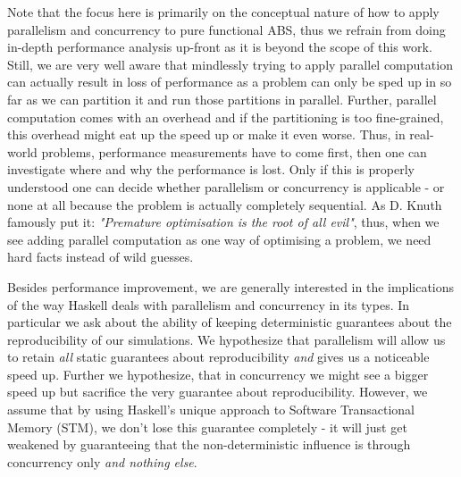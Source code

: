 Note that the focus here is primarily on the conceptual nature of how to apply parallelism and concurrency to pure functional ABS, thus we refrain from doing in-depth performance analysis up-front as it is beyond the scope of this work. Still, we are very well aware that mindlessly trying to apply parallel computation can actually result in loss of performance as a problem can only be sped up in so far as we can partition it and run those partitions in parallel. Further, parallel computation comes with an overhead and if the partitioning is too fine-grained, this overhead might eat up the speed up or make it even worse. Thus, in real-world problems, performance measurements have to come first, then one can investigate where and why the performance is lost. Only if this is properly understood one can decide whether parallelism or concurrency is applicable - or none at all because the problem is actually completely sequential. As D. Knuth famously put it: \textit{"Premature optimisation is the root of all evil"}, thus, when we see adding parallel computation as one way of optimising a problem, we need hard facts instead of wild guesses.

Besides performance improvement, we are generally interested in the implications of the way Haskell deals with parallelism and concurrency in its types. In particular we ask about the ability of keeping deterministic guarantees about the reproducibility of our simulations. We hypothesize that parallelism will allow us to retain \textit{all} static guarantees about reproducibility \textit{and} gives us a noticeable speed up. Further we hypothesize, that in concurrency we might see a bigger speed up but sacrifice the very guarantee about reproducibility. However, we assume that by using Haskell's unique approach to Software Transactional Memory (STM), we don't lose this guarantee completely - it will just get weakened by guaranteeing that the non-deterministic influence is through concurrency only \textit{and nothing else}.



